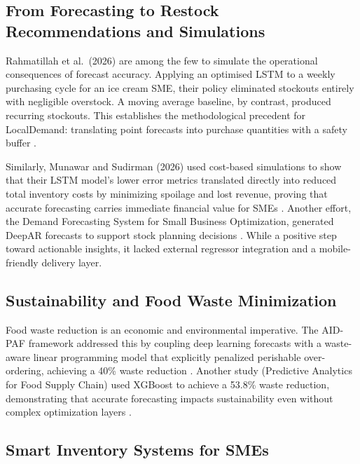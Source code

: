 \documentclass[conference]{IEEEtran}
\begin{document}
\subsection{From Forecasting to Restock Recommendations and Simulations}

Rahmatillah et al.\ (2026) are among the few to simulate the operational 
consequences of forecast accuracy. Applying an optimised LSTM to a weekly 
purchasing cycle for an ice cream SME, their policy eliminated stockouts 
entirely with negligible overstock. A moving average baseline, by contrast, 
produced recurring stockouts. This establishes the methodological precedent 
for LocalDemand: translating point forecasts into purchase quantities with 
a safety buffer \cite{rahmatillah2026}. 

Similarly, Munawar and Sudirman (2026) used cost-based simulations to show 
that their LSTM model's lower error metrics translated directly into reduced 
total inventory costs by minimizing spoilage and lost revenue, proving that 
accurate forecasting carries immediate financial value for SMEs \cite{munawar2026}.
Another effort, the Demand Forecasting System for Small Business Optimization, 
generated DeepAR forecasts to support stock planning decisions \cite{smallbiz_deepar}. 
While a positive step toward actionable insights, it lacked external regressor 
integration and a mobile-friendly delivery layer.

\subsection{Sustainability and Food Waste Minimization}

Food waste reduction is an economic and environmental imperative. The 
AID-PAF framework addressed this by coupling deep learning forecasts with 
a waste-aware linear programming model that explicitly penalized perishable 
over-ordering, achieving a 40\% waste reduction \cite{aidpaf}. Another 
study (Predictive Analytics for Food Supply Chain) used XGBoost to achieve 
a 53.8\% waste reduction, demonstrating that accurate forecasting impacts 
sustainability even without complex optimization layers \cite{foodwaste_ml}.

\subsection{Smart Inventory Systems for SMEs}
\end{document}
